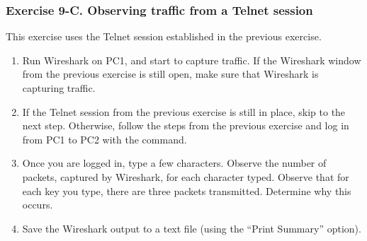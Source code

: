 \subsubsection*{Exercise 9-C. Observing traffic from a Telnet session}

This exercise uses the Telnet session established in the previous exercise.
\begin{enumerate}
	\item Run Wireshark on PC1, and start to capture traffic. If the Wireshark window from the previous exercise is still open, make sure that Wireshark is capturing traffic.
	\item If the Telnet session from the previous exercise is still in place, skip to the next step. Otherwise, follow the steps from the previous exercise and log in from PC1 to PC2 with the  command.
	\item Once you are logged in, type a few characters. Observe the number of packets, captured by Wireshark, for each character typed. Observe that for each key you type, there are three packets transmitted. Determine why this occurs.
	\item Save the Wireshark output to a text file (using the ``Print Summary'' option).
\end{enumerate}

\begin{questions}
\end{questions}
